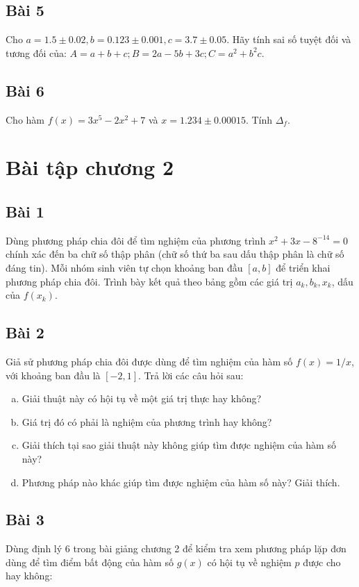 \documentclass[12pt]{article}
\begin{document}
\subsection{Bài 5}
Cho $a=1.5 \pm 0.02, b=0.123 \pm 0.001, c=3.7 \pm 0.05$. Hãy tính sai số tuyệt đối và tương đối của: $A=a+b+c; B= 2a - 5b + 3c; C = a^2+b^2 c$.

\subsection{Bài 6}
Cho hàm $f(x) = 3x^5 - 2x^2 + 7$ và $x=1.234 \pm 0.00015$. Tính $\Delta_f$.

\section{Bài tập chương 2}

\subsection{Bài 1}
Dùng phương pháp chia đôi để tìm nghiệm của phương trình $x^2+3x-8^{-14}=0$ chính xác đến ba chữ số thập phân (chữ số thứ ba sau dấu thập phân là chữ số đáng tin). Mỗi nhóm sinh viên tự chọn khoảng ban đầu $[a,b]$ để triển khai phương pháp chia đôi. Trình bày kết quả theo bảng gồm các giá trị $a_k, b_k, x_k$, dấu của $f(x_k)$.

\subsection{Bài 2}
Giả sử phương pháp chia đôi được dùng để tìm nghiệm của hàm số $f(x) = 1/x$, với khoảng ban đầu là $[-2,1]$. Trả lời các câu hỏi sau:
\begin{enumerate}[a)]
 \item Giải thuật này có hội tụ về một giá trị thực hay không?
 \item Giá trị đó có phải là nghiệm của phương trình hay không?
 \item Giải thích tại sao giải thuật này không giúp tìm được nghiệm của hàm số này?
 \item Phương pháp nào khác giúp tìm được nghiệm của hàm số này? Giải thích.
\end{enumerate}

\subsection{Bài 3}
Dùng định lý 6 trong bài giảng chương 2 để kiểm tra xem phương pháp lặp đơn dùng để tìm điểm bất động của hàm số $g(x)$ có hội tụ về nghiệm $p$ được cho hay không:
\end{document}
